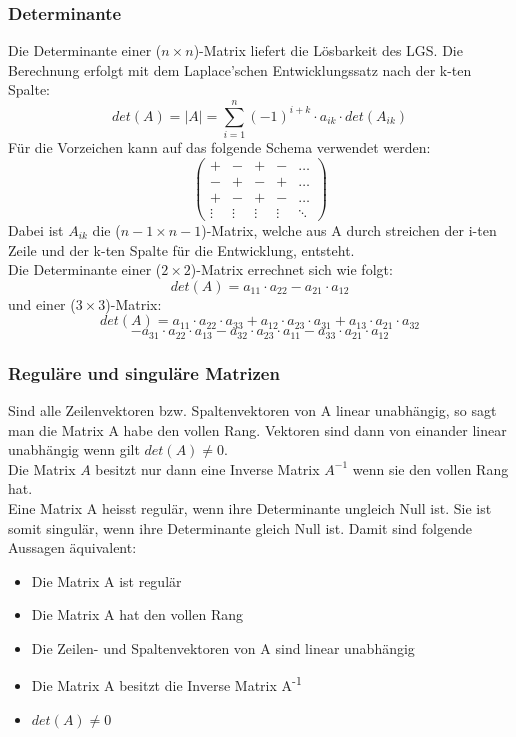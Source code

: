 \documentclass[10pt]{scrartcl}
\begin{document}
\begin{multicols}{2}
\subsubsection*{Determinante}
Die Determinante einer ($n \times n$)-Matrix liefert die Lösbarkeit des LGS. Die Berechnung erfolgt mit dem Laplace'schen Entwicklungssatz nach der k-ten Spalte:
\begin{equation}
det(A) = |A| = \sum_{i=1}^n (-1)^{i+k} \cdot a_{ik} \cdot det(A_{ik})
\end{equation}
Für die Vorzeichen kann auf das folgende Schema verwendet werden:
\begin{equation}
\begin{pmatrix}
+ & - & + & - & \dots\\
- & + & - & + & \dots\\
+ & - & + & - & \dots\\
\vdots & \vdots & \vdots & \vdots & \ddots
\end{pmatrix}
\end{equation}
Dabei ist $A_{ik}$ die ($n-1 \times n-1$)-Matrix, welche aus A durch streichen der i-ten Zeile und der k-ten Spalte für die Entwicklung, entsteht.\\
Die Determinante einer ($2 \times 2$)-Matrix errechnet sich wie folgt:
\begin{equation}
det(A) = a_{11} \cdot a_{22} - a_{21} \cdot a_{12}
\end{equation}
und einer ($3 \times 3$)-Matrix:
\begin{equation}
det(A) = a_{11} \cdot a_{22} \cdot a_{33} + a_{12} \cdot a_{23} \cdot a_{31} + a_{13} \cdot a_{21} \cdot a_{32} \end{equation}
\[- a_{31} \cdot a_{22} \cdot a_{13} - a_{32} \cdot a_{23} \cdot a_{11} - a_{33} \cdot a_{21} \cdot a_{12}\]
\subsubsection*{Reguläre und singuläre Matrizen}
Sind alle Zeilenvektoren bzw. Spaltenvektoren von A linear unabhängig, so sagt man die Matrix A habe den vollen Rang. Vektoren sind dann von einander linear unabhängig wenn gilt $det(A)\neq0$.\\
Die Matrix $A$ besitzt nur dann eine Inverse Matrix $A^{-1}$ wenn sie den vollen Rang hat.\\
Eine Matrix A heisst regulär, wenn ihre Determinante ungleich Null ist. Sie ist somit singulär, wenn ihre Determinante gleich Null ist. Damit sind folgende Aussagen äquivalent:
\begin{itemize}
\item Die Matrix A ist regulär
\item Die Matrix A hat den vollen Rang
\item Die Zeilen- und Spaltenvektoren von A sind linear unabhängig
\item Die Matrix A besitzt die Inverse Matrix A\textsuperscript{-1}
\item $det(A)\neq0$
\end{itemize}

\end{multicols}
\end{document}
